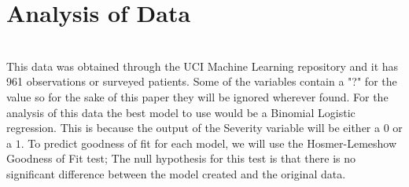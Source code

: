 \documentclass{article}
\begin{document}

\section{Analysis of Data}
\hfill \\
This data was obtained through the UCI Machine Learning repository and it has 961 observations or surveyed patients. Some of the variables contain a "?" for the value so for the sake of this paper they will be ignored wherever found. For the analysis of this data the best model to use would be a Binomial Logistic regression. This is because the output of the Severity variable will be either a $0$ or a $1$. To predict goodness of fit for each model, we will use the Hosmer-Lemeshow Goodness of Fit test; The null hypothesis for this test is that there is no significant difference between the model created and the original data. 
\end{document}
